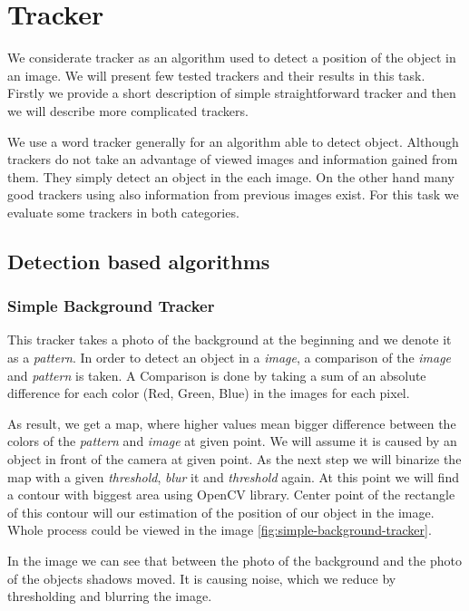 \chapter{Tracker}

We considerate tracker as an algorithm used to detect a position of the object in
an image. We will present few tested trackers and their results in this task.
Firstly we provide a short description of simple straightforward tracker and
then we will describe more complicated trackers.

We use a word tracker generally for an algorithm able to detect object.
Although trackers do not take an advantage of viewed images and information
gained from them. They simply detect an object in the each image. On the other
hand many good trackers using also information from previous images exist. For
this task we evaluate some trackers in both categories.
	
\section {Detection based algorithms}

\subsection{Simple Background Tracker}

This tracker takes a photo of the background at the beginning and we denote it
as a \emph{pattern}. In order to detect an object in a \emph{image}, a
comparison of the \emph{image} and \emph{pattern} is taken. A Comparison is
done by taking a sum of an absolute difference for each color (Red, Green,
Blue) in the images for each pixel. 

As result, we get a map, where higher values mean bigger difference between the
colors of the \emph{pattern} and \emph{image} at given point. We will assume it
is caused by an object in front of the camera at given point.  As the next step
we will binarize the map with a given \emph{threshold}, \emph{blur} it and
\emph{threshold} again. At this point we will find a contour with biggest area
using OpenCV library. Center point of the rectangle of this contour will our
estimation of the position of our object in the image. Whole process could be
viewed in the image \ref{fig:simple-background-tracker}.

In the image we can see that between the photo of the background and the photo
of the objects shadows moved. It is causing noise, which we reduce by
thresholding and blurring the image.

